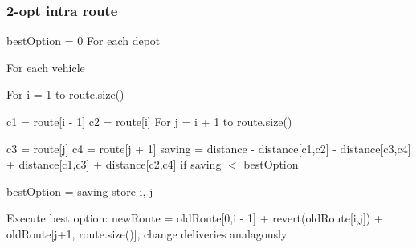 \subsubsection*{2-\/opt intra route}

best\+Option = 0 For each depot
\begin{DoxyItemize}
\item For each vehicle
\begin{DoxyItemize}
\item For i = 1 to route.\+size()
\begin{DoxyItemize}
\item c1 = route\mbox{[}i -\/ 1\mbox{]} c2 = route\mbox{[}i\mbox{]} For j = i + 1 to route.\+size()
\begin{DoxyItemize}
\item c3 = route\mbox{[}j\mbox{]} c4 = route\mbox{[}j + 1\mbox{]} saving = distance -\/ distance\mbox{[}c1,c2\mbox{]} -\/ distance\mbox{[}c3,c4\mbox{]} + distance\mbox{[}c1,c3\mbox{]} + distance\mbox{[}c2,c4\mbox{]} if saving $<$ best\+Option
\begin{DoxyItemize}
\item best\+Option = saving store i, j
\end{DoxyItemize}
\end{DoxyItemize}
\end{DoxyItemize}
\end{DoxyItemize}
\end{DoxyItemize}

Execute best option\+: new\+Route = old\+Route\mbox{[}0,i -\/ 1\mbox{]} + revert(old\+Route\mbox{[}i,j\mbox{]}) + old\+Route\mbox{[}j+1, route.\+size()\mbox{]}, change deliveries analagously 
